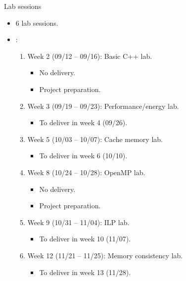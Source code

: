 \begin{frame}[t]{Lab sessions}
\begin{itemize}
  \item 6 lab sessions.

  \item {}:
    \begin{enumerate}
      \item Week 2 (09/12 -- 09/16): Basic C++ lab.
        \begin{itemize}
          \item No delivery.
          \item Project preparation.
        \end{itemize}
      \item Week 3 (09/19 -- 09/23): Performance/energy lab.
        \begin{itemize}
          \item To deliver in week 4 (09/26).
        \end{itemize}
      \item Week 5 (10/03 -- 10/07): Cache memory lab.
        \begin{itemize}
          \item To deliver in week 6 (10/10).
        \end{itemize}
      \item Week 8 (10/24 -- 10/28): OpenMP lab.
        \begin{itemize}
          \item No delivery.
          \item Project preparation.
        \end{itemize}
      \item Week 9 (10/31 -- 11/04): ILP lab.
        \begin{itemize}
          \item To deliver in week 10 (11/07).
        \end{itemize}
      \item Week 12 (11/21 -- 11/25): Memory consistency lab.
        \begin{itemize}
          \item To deliver in week 13 (11/28).
        \end{itemize}
    \end{enumerate}
\end{itemize}
\end{frame}

